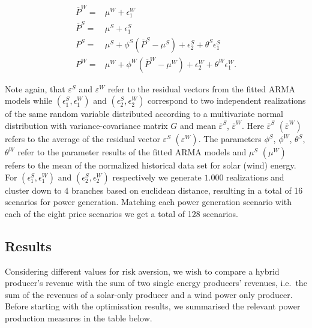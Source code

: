 \begin{align}
\overline{P}^{W}=& \mu^W+\epsilon_1^W\\
\overline{P}^{S}=& \mu^S+\epsilon_1^S\\
{P}^{S}=&\mu^S + \phi^S \left(\overline{P}^{S}-\mu^S\right)+\epsilon^S_2 + \theta^S\epsilon^S_1\\
{P}^{W}=&\mu^W + \phi^W \left(\overline{P}^{W}-\mu^W\right)+\epsilon^W_2 + \theta^W\epsilon^W_1.
\end{align}


Note again, that $\varepsilon^S$ and $\varepsilon^W$ refer to the residual vectors from the fitted ARMA models while $\left(\epsilon_1^S,\epsilon_1^W\right)$ and $\left(\epsilon_2^S,\epsilon_2^W\right)$ correspond to two independent realizations of the same random variable distributed according to a multivariate normal distribution with variance-covariance matrix $G$ and mean $\overline{\varepsilon}^S$, $\overline{\varepsilon}^W$. Here $\overline{\varepsilon}^S$ $\left(\overline{\varepsilon}^W\right)$ refers to the average of the residual vector $\varepsilon^S$ $\left(\varepsilon^W\right)$. The parameters $\phi^S$, $\phi^W$, $\theta^S$, $\theta^W$ refer to the parameter results of the fitted ARMA models and $\mu^S$ $\left(\mu^W\right)$ refers to the mean of the normalized historical data set for solar (wind) energy. For $\left(\epsilon_1^S,\epsilon_1^W\right)$ and $\left(\epsilon_2^S,\epsilon_2^W\right)$ respectively we generate $1.000$ realizations and cluster down to 4 branches based on euclidean distance, resulting in a total of 16 scenarios for power generation. Matching each power generation scenario with each of the eight price scenarios we get a total of 128 scenarios.



\subsection{Results}





Considering different values for risk aversion, we wish to compare a hybrid producer's revenue with the sum of two single energy producers' revenues, i.e.\ the sum of the revenues of a solar-only producer and a wind power only producer. Before starting with the optimisation results, we summarised the relevant power production measures in the table below. 


